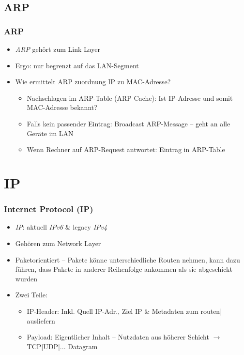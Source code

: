\documentclass[xcolor=dvipsnames, aspectratio=169]{beamer}
\begin{document}
\subsection{ARP}
\begin{frame}
	\frametitle{ARP}
	\begin{itemize}
		\item \emph{ARP} gehört zum Link Layer
		\item Ergo: nur begrenzt auf das LAN-Segment
		\item Wie ermittelt ARP zuordnung IP zu MAC-Adresse?
		\begin{itemize}
			\item Nachschlagen im ARP-Table (ARP Cache): Ist IP-Adresse und somit MAC-Adresse bekannt?
			\item Falls kein passender Eintrag: Broadcast ARP-Message -- geht an alle Geräte im LAN
			\item Wenn Rechner auf ARP-Request antwortet: Eintrag in ARP-Table
		\end{itemize}
	\end{itemize}
\end{frame}

\section{IP}
\begin{frame}
	\frametitle{Internet Protocol (IP)}
	\begin{itemize}
		\item \emph{IP}: aktuell \emph{IPv6} \& legacy \emph{IPv4}
		\item Gehören zum Network Layer
		\item Paketorientiert -- Pakete könne unterschiedliche Routen nehmen, kann dazu führen, dass Pakete in anderer Reihenfolge ankommen als sie abgeschickt wurden
		\item Zwei Teile:
		\begin{itemize}
			\item IP-Header: Inkl. Quell IP-Adr., Ziel IP \&  Metadaten zum routen| ausliefern
			\item  Payload: Eigentlicher Inhalt -- Nutzdaten aus höherer Schicht $\rightarrow$ TCP|UDP|... Datagram
		\end{itemize}
	\end{itemize}
\end{frame}
\end{document}
